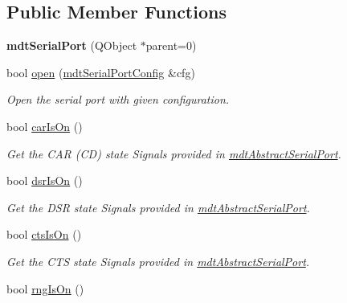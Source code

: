 \subsection*{Public Member Functions}
\begin{DoxyCompactItemize}
\item 
\hypertarget{classmdt_serial_port_a7b2da083885e727981c1fd4414634cae}{
{\bfseries mdtSerialPort} (QObject $\ast$parent=0)}
\label{classmdt_serial_port_a7b2da083885e727981c1fd4414634cae}

\item 
bool \hyperlink{classmdt_serial_port_a523cc099b9fff06c46ce1c251646ca20}{open} (\hyperlink{classmdt_serial_port_config}{mdtSerialPortConfig} \&cfg)
\begin{DoxyCompactList}\small\item\em Open the serial port with given configuration. \end{DoxyCompactList}\item 
\hypertarget{classmdt_serial_port_a3eb4d41f925e40b08365ad270ee3662e}{
bool \hyperlink{classmdt_serial_port_a3eb4d41f925e40b08365ad270ee3662e}{carIsOn} ()}
\label{classmdt_serial_port_a3eb4d41f925e40b08365ad270ee3662e}

\begin{DoxyCompactList}\small\item\em Get the CAR (CD) state  Signals provided in \hyperlink{classmdt_abstract_serial_port}{mdtAbstractSerialPort}. \end{DoxyCompactList}\item 
\hypertarget{classmdt_serial_port_a8e5c0750746ac4639af4e3e51d2d52e3}{
bool \hyperlink{classmdt_serial_port_a8e5c0750746ac4639af4e3e51d2d52e3}{dsrIsOn} ()}
\label{classmdt_serial_port_a8e5c0750746ac4639af4e3e51d2d52e3}

\begin{DoxyCompactList}\small\item\em Get the DSR state  Signals provided in \hyperlink{classmdt_abstract_serial_port}{mdtAbstractSerialPort}. \end{DoxyCompactList}\item 
\hypertarget{classmdt_serial_port_a0abb533edb3d8487a7ec03f8c2fb4eb2}{
bool \hyperlink{classmdt_serial_port_a0abb533edb3d8487a7ec03f8c2fb4eb2}{ctsIsOn} ()}
\label{classmdt_serial_port_a0abb533edb3d8487a7ec03f8c2fb4eb2}

\begin{DoxyCompactList}\small\item\em Get the CTS state  Signals provided in \hyperlink{classmdt_abstract_serial_port}{mdtAbstractSerialPort}. \end{DoxyCompactList}\item 
\hypertarget{classmdt_serial_port_a92c24c78e80a297af38a8fa48f6686a8}{
bool \hyperlink{classmdt_serial_port_a92c24c78e80a297af38a8fa48f6686a8}{rngIsOn} ()}
\label{classmdt_serial_port_a92c24c78e80a297af38a8fa48f6686a8}


\end{DoxyCompactItemize}
